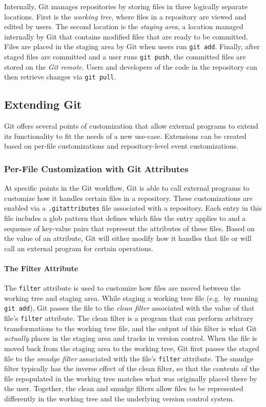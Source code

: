 \documentclass[nohyperref]{article}
\def\code#1{\texttt{#1}}
\theoremstyle{plain}
\theoremstyle{definition}
\theoremstyle{remark}
\newcommand{\brian}[1]{\textcolor{Plum}{\bf\small [\textsc{brian}:~#1]}}
\begin{document}
Internally, Git manages repositories by storing files in three logically separate locations. First is the \emph{working tree}, where files in a repository are viewed and edited by users. The second location is the \emph{staging area}, a location managed internally by Git that contains modified files that are ready to be committed. Files are placed in the staging area by Git when users run \code{git add}. Finally, after staged files are committed and a user runs \code{git push}, the committed files are stored on the \emph{Git remote}. Users and developers of the code in the repository can then retrieve changes via \code{git pull}.

\subsection{Extending Git} \label{ssec:extending_git}
Git offers several points of customization that allow external programs to extend its functionality to fit the needs of a new use-case. Extensions can be created based on per-file customizations and repository-level event customizations.

\subsubsection{Per-File Customization with Git Attributes}
At specific points in the Git workflow, Git is able to call external programs to customize how it handles certain files in a repository. 
These customizations are enabled via a \code{.gitattributes} file associated with a repository. Each entry in this file includes a glob pattern that defines which files the entry applies to and a sequence of key-value pairs that represent the attributes of these files. Based on the value of an attribute, Git will either modify how it handles that file or will call an external program for certain operations.


\paragraph{The Filter Attribute}
The \code{filter} attribute is used to customize how files are moved between the working tree and staging area.
While staging a working tree file (e.g.\ by running \code{git add}), Git passes the file to the \emph{clean filter} associated with the value of that file's \code{filter} attribute. The clean filter is a program that can perform arbitrary transformations to the working tree file, and the output of this filter is what Git \emph{actually} places in the staging area and tracks in version control.
When the file is moved back from the staging area to the working tree, Git first passes the staged file to the \emph{smudge filter} associated with the file's \code{filter} attribute. The smudge filter typically has the inverse effect of the clean filter, so that the contents of the file repopulated in the working tree matches what was originally placed there by the user.
Together, the clean and smudge filters allow files to be represented differently in the working tree and the underlying version control system.
\end{document}
